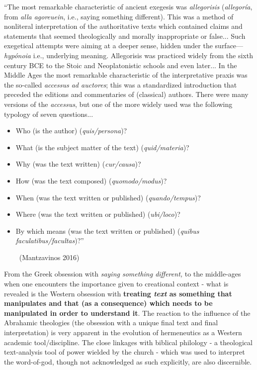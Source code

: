 \begin{myquote}
“The most remarkable characteristic of ancient exegesis was \textit{allegorisis} (\textit{allegoría}, from \textit{alla agoreuein}, i.e., saying something different). This was a method of nonliteral interpretation of the authoritative texts which contained claims and statements that seemed theologically and morally inappropriate or false... Such exegetical attempts were aiming at a deeper sense, hidden under the surface—\textit{hypónoia} i.e., underlying meaning. Allegorisis was practiced widely from the sixth century BCE to the Stoic and Neoplatonistic schools and even later... In the Middle Ages the most remarkable characteristic of the interpretative praxis was the so-called \textit{accessus ad auctores}; this was a standardized introduction that preceded the editions and commentaries of (classical) authors. There were many versions of the \textit{accessus}, but one of the more widely used was the following typology of seven questions...
\begin{itemize}
\itemsep=0pt
\item Who (is the author) (\textit{quis/persona})?

 \item What (is the subject matter of the text) (\textit{quid/materia})?

 \item Why (was the text written) (\textit{cur/causa})?

 \item How (was the text composed) (\textit{quomodo/modus})?

 \item When (was the text written or published) (\textit{quando/tempus})?

 \item Where (was the text written or published) (\textit{ubi/loco})?

 \item By which means (was the text written or published) (\textit{quibus faculatibus/facultas})?”

~\hfill (Mantzavinos 2016)

\end{itemize}
\end{myquote}

From the Greek obsession with \textit{saying something different,} to the middle-ages when one encounters the importance given to creational context - what is revealed is the Western obsession with \textbf{treating \textit{text} as something that manipulates and that (as a consequence) which needs to be manipulated in order to understand it}. The reaction to the influence of the Abrahamic theologies (the obsession with a unique final text and final interpretation) is very apparent in the evolution of hermeneutics as a Western academic tool/discipline. The close linkages with biblical philology - a theological text-analysis tool of power wielded by the church - which was used to interpret the word-of-god, though not acknowledged as such explicitly, are also discernible.


